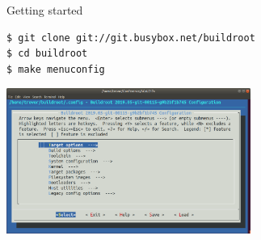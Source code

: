 \documentclass[aspectratio=169,obeyspaces,spaces,hyphens,dvipsnames]{beamer}
\begin{document}
\begin{frame}[fragile]{Getting started}
  \begin{block}{}
    \begin{verbatim}
$ git clone git://git.busybox.net/buildroot
$ cd buildroot
$ make menuconfig
\end{verbatim}
  \end{block}
  \vspace{0.1cm}
  \begin{center}
    \includegraphics[width=0.6\textwidth]{woerner/buildroot-screenshot.png}
  \end{center}
\end{frame}
\end{document}
